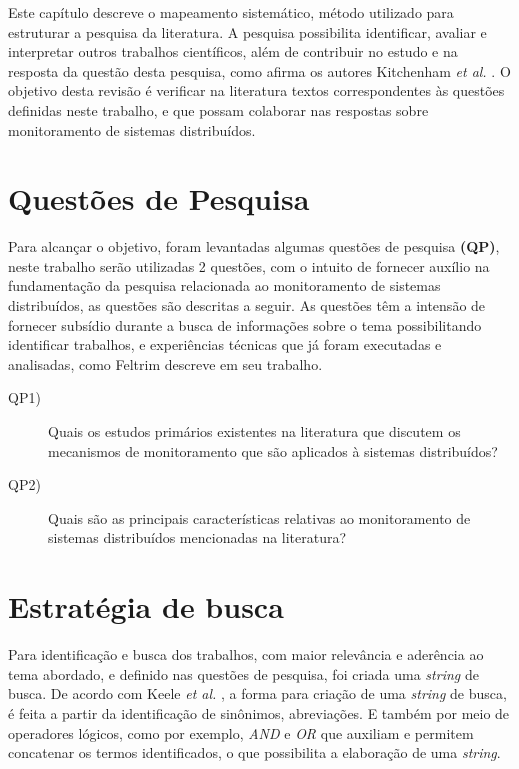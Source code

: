 \label{mapeamento_sistematico}

Este capítulo descreve o mapeamento sistemático, método utilizado para estruturar a pesquisa da literatura. A pesquisa possibilita identificar, avaliar e interpretar outros trabalhos científicos, além de contribuir no estudo e na resposta da questão desta pesquisa, como afirma os autores Kitchenham \textit{et al.} \cite{kitchenham2007guidelines,petticrew2008systematic,de2018mapeamento}. O objetivo desta revisão é verificar na literatura textos correspondentes às questões definidas neste trabalho, e que possam colaborar nas respostas sobre monitoramento de sistemas distribuídos.


\section{Questões de Pesquisa}
\label{questoes1e2}

Para alcançar o objetivo, foram levantadas algumas questões de pesquisa \textbf{(QP)}, neste trabalho serão utilizadas 2 questões, com o intuito de fornecer auxílio na fundamentação da pesquisa relacionada ao monitoramento de sistemas distribuídos, as questões são descritas a seguir. As questões têm a intensão de fornecer subsídio durante a busca de informações sobre o tema possibilitando identificar trabalhos, e experiências técnicas que já foram executadas e analisadas, como Feltrim\cite{feltrim2004abordagem} descreve em seu trabalho.

\begin{description}
\item[QP1)] Quais os estudos primários existentes na literatura que discutem os mecanismos de monitoramento 
que são aplicados à sistemas distribuídos?
\item[QP2)] Quais são as principais características relativas ao monitoramento de sistemas
distribuídos mencionadas na literatura?
\end{description}


\section{Estratégia de busca}
\label{sec:stringbusca}

Para identificação e busca dos trabalhos, com maior relevância e aderência ao tema abordado, e definido nas questões de pesquisa, foi criada uma \textit{string} de busca. De acordo com Keele \textit{et al.} \cite{keele2007guidelines}, a forma para criação de uma \textit{string} de busca, é feita a partir da identificação de sinônimos, abreviações. E também por meio de operadores lógicos, como por exemplo, \textit{AND} e \textit{OR} que auxiliam e permitem concatenar os termos identificados, o que possibilita a elaboração de uma \textit{string}. 

